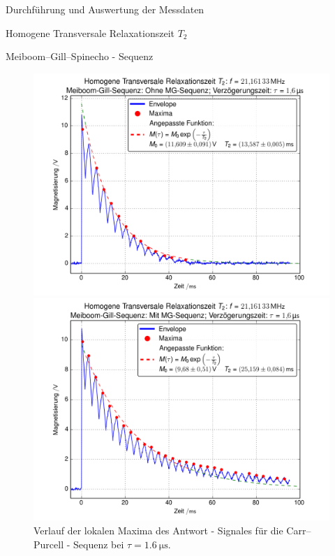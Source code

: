 \documentclass[pdftex, a4paper,11pt, twoside, ngerman]{report}
\begin{document}
\begin{chapter}{Durchführung und Auswertung der Messdaten}
\begin{section}{
        Homogene Transversale Relaxationszeit $T_{2}$}
\begin{subsection}{Meiboom--Gill--Spinecho - Sequenz}
        \begin{figure}[htb]
          \centering
          \begin{minipage}{.48\textwidth}
            \centering
            \includegraphics[width=\textwidth]
            {Figures/HomoTransRelax_MG_env0.png}
            \caption{Verlauf der lokalen Maxima des Antwort - Signales für die
              Carr--Purcell - Sequenz bei $\tau = \SI{1.6}{\micro\second}$.}
            \label{figMG_env0}
          \end{minipage}\quad
          \begin{minipage}{.48\textwidth}
            \centering
            \includegraphics[width=\textwidth]
            {Figures/HomoTransRelax_MG_env1.png}

\end{minipage}
\end{figure}
\end{subsection}
\end{section}
\end{chapter}
\end{document}
